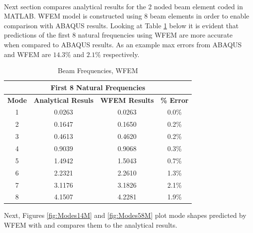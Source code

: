 \documentclass[12pt]{article}
\begin{document}
\paragraph{}
Next section compares analytical results for the 2 noded beam element coded in MATLAB. WFEM model is constructed using 8 beam elements in order to enable comparison with ABAQUS results. Looking at Table \ref{tab:T2} below it is evident that predictions of the first 8 natural frequencies using WFEM are more accurate when compared to ABAQUS results. As an example max errors from ABAQUS and WFEM are $14.3 \%$ and $2.1 \%$ respectively.

\begin{table}[H]
  \centering
  \caption{Beam Frequencies, WFEM}
    \begin{tabular}{cccc}
    \toprule
    \multicolumn{4}{c}{\textbf{First 8 Natural Frequencies}} \\
    \midrule
    \textbf{Mode} & \textbf{Analytical Resuls} & \textbf{WFEM Results} & \textbf{\% Error} \\
    1     & 0.0263 & 0.0263 & 0.0\% \\
    2     & 0.1647 & 0.1650 & 0.2\% \\
    3     & 0.4613 & 0.4620 & 0.2\% \\
    4     & 0.9039 & 0.9068 & 0.3\% \\
    5     & 1.4942 & 1.5043 & 0.7\% \\
    6     & 2.2321 & 2.2610 & 1.3\% \\
    7     & 3.1176 & 3.1826 & 2.1\% \\
    8     & 4.1507 & 4.2281 & 1.9\% \\
    \bottomrule
    \end{tabular}%
  \label{tab:T2}%
\end{table}%

Next, Figures \ref{fig:Modes14M} and \ref{fig:Modes58M} plot mode shapes predicted by WFEM with and compares them to the analytical results.
\end{document}
